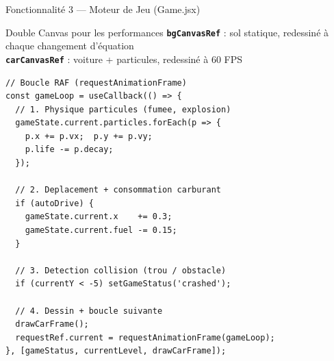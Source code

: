 \documentclass[aspectratio=169,12pt]{beamer}
\newcommand{\tech}[1]{\textcolor{mycyan}{\textbf{\texttt{#1}}}}
\begin{document}
\begin{frame}{Fonctionnalit\'e 3 --- Moteur de Jeu (Game.jsx)}
  \begin{block}{Double Canvas pour les performances}
    \tech{bgCanvasRef} : sol statique, redessin\'e \`a chaque changement d'\'equation\\
    \tech{carCanvasRef} : voiture + particules, redessin\'e \`a 60 FPS
  \end{block}
\begin{lstlisting}
// Boucle RAF (requestAnimationFrame)
const gameLoop = useCallback(() => {
  // 1. Physique particules (fumee, explosion)
  gameState.current.particles.forEach(p => {
    p.x += p.vx;  p.y += p.vy;
    p.life -= p.decay;
  });

  // 2. Deplacement + consommation carburant
  if (autoDrive) {
    gameState.current.x    += 0.3;
    gameState.current.fuel -= 0.15;
  }

  // 3. Detection collision (trou / obstacle)
  if (currentY < -5) setGameStatus('crashed');

  // 4. Dessin + boucle suivante
  drawCarFrame();
  requestRef.current = requestAnimationFrame(gameLoop);
}, [gameStatus, currentLevel, drawCarFrame]);
\end{lstlisting}
\end{frame}
\end{document}
